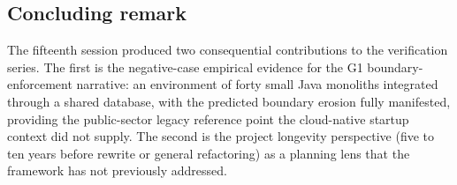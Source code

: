 \subsection*{Concluding remark}

The fifteenth session produced two consequential contributions to the verification series. The first is the negative-case empirical evidence for the G1 boundary-enforcement narrative: an environment of forty small Java monoliths integrated through a shared database, with the predicted boundary erosion fully manifested, providing the public-sector legacy reference point the cloud-native startup context did not supply. The second is the project longevity perspective (five to ten years before rewrite or general refactoring) as a planning lens that the framework has not previously addressed.
